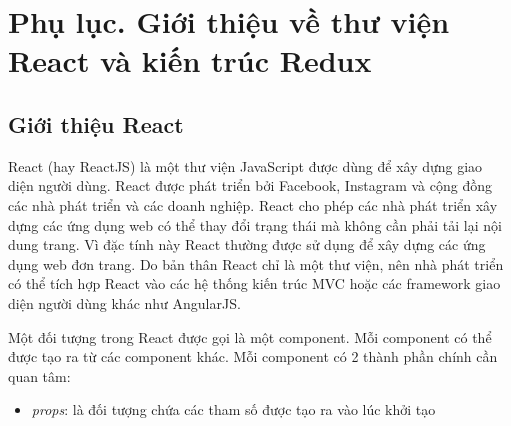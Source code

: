 
\chapter*{Phụ lục. Giới thiệu về thư viện React và kiến trúc Redux}

\section*{Giới thiệu React}
React (hay ReactJS) là một thư viện JavaScript được dùng để xây dựng giao diện người dùng. React được phát triển bởi Facebook, Instagram và cộng đồng các nhà phát triển và các doanh nghiệp. React cho phép các nhà phát triển xây dựng các ứng dụng web có thể thay đổi trạng thái mà không cần phải tải lại nội dung trang. Vì đặc tính này React thường được sử dụng để xây dựng các ứng dụng web đơn trang. Do bản thân React chỉ là một thư viện, nên nhà phát triển có thể tích hợp React vào các hệ thống kiến trúc MVC hoặc các framework giao diện người dùng khác như AngularJS.

Một đối tượng trong React được gọi là một component. Mỗi component có thể được tạo ra từ các component khác. Mỗi component có 2 thành phần chính cần quan tâm:
\begin{itemize}
  \item \textit{props}: là đối tượng chứa các tham số được tạo ra vào lúc khởi tạo 
\end{itemize}

